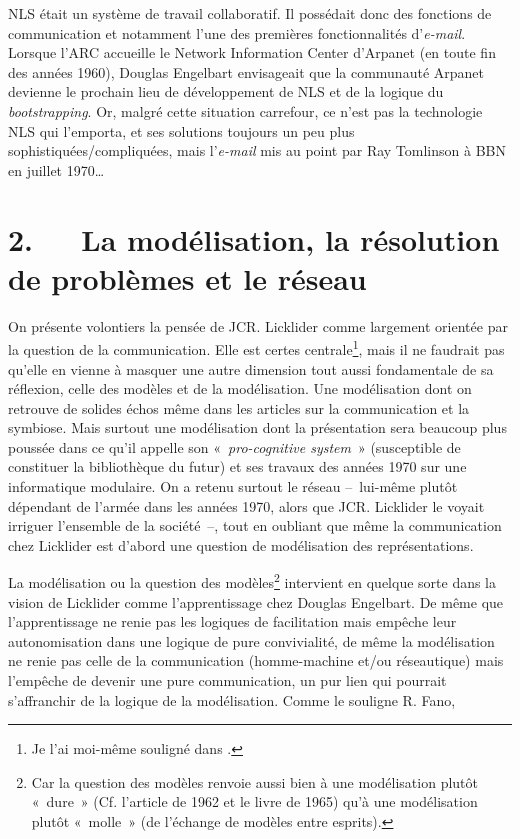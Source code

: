 \documentclass{FramateX}
\begin{document}
\begin{refsection}
NLS était un système de travail collaboratif. Il possédait donc des
fonctions de communication et notamment l'une des premières
fonctionnalités d'\textit{e-mail}. Lorsque l'ARC accueille le Network
Information Center d'Arpanet (en toute fin des années 1960), Douglas
Engelbart envisageait que la communauté Arpanet devienne le prochain
lieu de développement de NLS et de la logique du \textit{bootstrapping}. Or,
malgré cette situation carrefour, ce n'est pas la technologie NLS qui
l'emporta, et ses solutions toujours un peu plus
sophistiquées/compliquées, mais l'\textit{e-mail} mis au point par Ray Tomlinson
à BBN en juillet 1970\ldots

\section*{2.~~~La modélisation, la résolution de problèmes et le réseau}
{}


On présente volontiers la pensée de JCR. Licklider comme largement
orientée par la question de la communication. Elle est certes
centrale\footnote{Je l'ai moi-même souligné dans \cite{robertjcr2011}.}, mais il ne faudrait pas qu'elle en vienne à masquer une autre
dimension tout aussi fondamentale de sa réflexion, celle des modèles
et de la modélisation. Une modélisation dont on retrouve de solides
échos même dans les articles sur la communication et la symbiose. Mais
surtout une modélisation dont la présentation sera beaucoup plus
poussée dans ce qu'il appelle son «~\textit{pro-cognitive system}~» (susceptible
de constituer la bibliothèque du futur) et ses travaux des années 1970
sur une informatique modulaire. On a retenu surtout le réseau --~lui-même
plutôt dépendant de l'armée dans les années 1970, alors que JCR.
Licklider le voyait irriguer l'ensemble de la société~--, tout en oubliant que même la communication chez Licklider est d'abord une question de modélisation des représentations.

La modélisation ou la question des modèles\footnote{Car la question des
modèles renvoie aussi bien à une modélisation plutôt «~dure~» (Cf.
l'article de 1962 et le livre de 1965) qu'à une modélisation plutôt
«~molle~» (de l'échange de modèles entre esprits).} intervient en
quelque sorte dans la vision de Licklider comme l'apprentissage
chez Douglas Engelbart. De même que l'apprentissage ne renie pas les
logiques de facilitation mais empêche leur autonomisation dans une
logique de pure convivialité, de même la modélisation ne renie pas
celle de la communication (homme-machine et/ou réseautique) mais
l'empêche de devenir une pure communication, un pur lien qui pourrait
s'affranchir de la logique de la modélisation. Comme le souligne R. Fano, 


\end{refsection}
\end{document}
